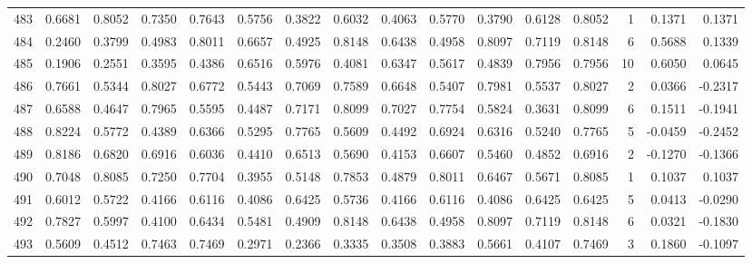 \begin{tabular}{lrrrrrrrrrrrrrrr}
483 &      0.6681 &  0.8052 &  0.7350 &  0.7643 &  0.5756 &  0.3822 &  0.6032 &  0.4063 &  0.5770 &  0.3790 &   0.6128 &     0.8052 &      1 &                    0.1371 &                     0.1371 \\
484 &      0.2460 &  0.3799 &  0.4983 &  0.8011 &  0.6657 &  0.4925 &  0.8148 &  0.6438 &  0.4958 &  0.8097 &   0.7119 &     0.8148 &      6 &                    0.5688 &                     0.1339 \\
485 &      0.1906 &  0.2551 &  0.3595 &  0.4386 &  0.6516 &  0.5976 &  0.4081 &  0.6347 &  0.5617 &  0.4839 &   0.7956 &     0.7956 &     10 &                    0.6050 &                     0.0645 \\
486 &      0.7661 &  0.5344 &  0.8027 &  0.6772 &  0.5443 &  0.7069 &  0.7589 &  0.6648 &  0.5407 &  0.7981 &   0.5537 &     0.8027 &      2 &                    0.0366 &                    -0.2317 \\
487 &      0.6588 &  0.4647 &  0.7965 &  0.5595 &  0.4487 &  0.7171 &  0.8099 &  0.7027 &  0.7754 &  0.5824 &   0.3631 &     0.8099 &      6 &                    0.1511 &                    -0.1941 \\
488 &      0.8224 &  0.5772 &  0.4389 &  0.6366 &  0.5295 &  0.7765 &  0.5609 &  0.4492 &  0.6924 &  0.6316 &   0.5240 &     0.7765 &      5 &                   -0.0459 &                    -0.2452 \\
489 &      0.8186 &  0.6820 &  0.6916 &  0.6036 &  0.4410 &  0.6513 &  0.5690 &  0.4153 &  0.6607 &  0.5460 &   0.4852 &     0.6916 &      2 &                   -0.1270 &                    -0.1366 \\
490 &      0.7048 &  0.8085 &  0.7250 &  0.7704 &  0.3955 &  0.5148 &  0.7853 &  0.4879 &  0.8011 &  0.6467 &   0.5671 &     0.8085 &      1 &                    0.1037 &                     0.1037 \\
491 &      0.6012 &  0.5722 &  0.4166 &  0.6116 &  0.4086 &  0.6425 &  0.5736 &  0.4166 &  0.6116 &  0.4086 &   0.6425 &     0.6425 &      5 &                    0.0413 &                    -0.0290 \\
492 &      0.7827 &  0.5997 &  0.4100 &  0.6434 &  0.5481 &  0.4909 &  0.8148 &  0.6438 &  0.4958 &  0.8097 &   0.7119 &     0.8148 &      6 &                    0.0321 &                    -0.1830 \\
493 &      0.5609 &  0.4512 &  0.7463 &  0.7469 &  0.2971 &  0.2366 &  0.3335 &  0.3508 &  0.3883 &  0.5661 &   0.4107 &     0.7469 &      3 &                    0.1860 &                    -0.1097 \\

\end{tabular}
